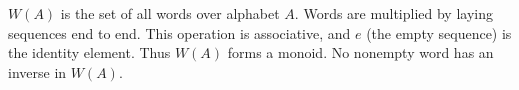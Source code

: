 $W(A)$ is the set of all words over alphabet $A$. Words are multiplied by laying sequences end to end. This operation is associative, and $e$ (the empty sequence) is the identity element. Thus $W(A)$ forms a monoid. No nonempty word has an inverse in $W(A)$.
